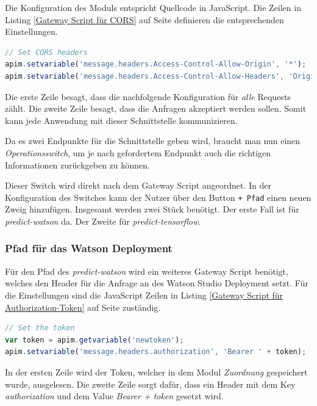 Die Konfiguration des Moduls entspricht Quellcode in JavaScript. Die Zeilen in Listing \ref{Gateway Script für CORS} auf
Seite \pageref{Gateway Script für CORS} definieren die entsprechenden Einstellungen.

\begin{lstlisting}[language=javascript, caption=Gateway Script für CORS, label=Gateway Script für CORS]
// Set CORS headers
apim.setvariable('message.headers.Access-Control-Allow-Origin', '*');
apim.setvariable('message.headers.Access-Control-Allow-Headers', 'Origin, X-Requested-With, Content-Type, Accept');
\end{lstlisting}

Die erste Zeile besagt, dass die nachfolgende Konfiguration für \textit{alle} Requests zählt. Die zweite Zeile besagt,
dass die Anfragen akzeptiert werden sollen. Somit kann jede Anwendung mit dieser Schnittstelle kommunizieren.

Da es zwei Endpunkte für die Schnittstelle geben wird, braucht man nun einen \textit{Operationsswitch}, um je nach
gefordertem Endpunkt auch die richtigen Informationen zurückgeben zu können.

Dieser Switch wird direkt nach dem Gateway Script angeordnet. In der Konfiguration des Switches kann der Nutzer über den
Button \texttt{+ Pfad} einen neuen Zweig hinzufügen. Insgesamt werden zwei Stück benötigt. Der erste Fall ist für
\textit{predict-watson} da. Der Zweite für \textit{predict-tensorflow}.

\subsubsection*{Pfad für das Watson Deployment}
Für den Pfad des \textit{predict-watson} wird ein weiteres Gateway Script benötigt, welches den Header für die Anfrage
an des Watson Studio Deployment setzt. Für die Einstellungen sind die JavaScript Zeilen in Listing
\ref{Gateway Script für Authorization-Token} auf Seite \pageref{Gateway Script für Authorization-Token} zuständig.

\begin{lstlisting}[language=javascript, caption=Gateway Script für Authorization-Token, label=Gateway Script für Authorization-Token]
// Set the token
var token = apim.getvariable('newtoken');
apim.setvariable('message.headers.authorization', 'Bearer ' + token);
\end{lstlisting}

In der ersten Zeile wird der Token, welcher in dem Modul \textit{Zuordnung} gespeichert wurde, ausgelesen. Die zweite
Zeile sorgt dafür, dass ein Header mit dem Key \textit{authorization} und dem Value \textit{Bearer + token} gesetzt wird.

